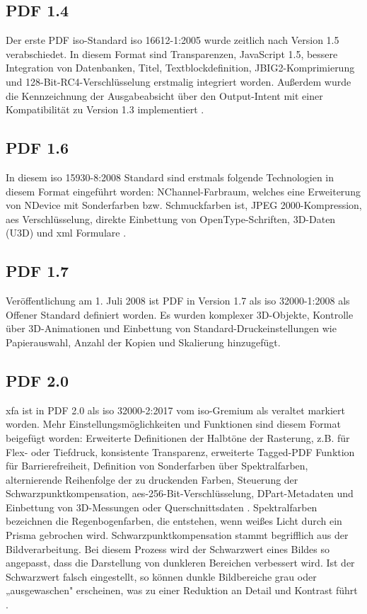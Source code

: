 \subsection{PDF 1.4}
Der erste PDF \gls{iso}-Standard \gls{iso} 16612-1:2005 wurde zeitlich nach Version 1.5 verabschiedet. In diesem Format sind Transparenzen, JavaScript 1.5, bessere Integration von Datenbanken, Titel, Textblockdefinition, JBIG2-Komprimierung und 128-Bit-RC4-Verschlüsselung erstmalig integriert worden\cite{proj-consult}. Außerdem wurde die Kennzeichnung der Ausgabeabsicht über den Output-Intent mit einer Kompatibilität zu Version 1.3 implementiert \cite{schneeberger}.

\subsection{PDF 1.6}
In diesem \gls{iso} 15930-8:2008 Standard sind erstmals folgende Technologien in diesem Format eingeführt worden: NChannel-Farbraum, welches eine Erweiterung von NDevice mit Sonderfarben bzw. Schmuckfarben ist, JPEG 2000-Kompression, \gls{aes} Verschlüsselung, direkte Einbettung von OpenType-Schriften, 3D-Daten (U3D) und \gls{xml} Formulare \cite{proj-consult}.

\subsection{PDF 1.7}
Veröffentlichung am 1. Juli 2008 ist PDF in Version 1.7 als \gls{iso} 32000-1:2008 als Offener Standard definiert worden. Es wurden komplexer 3D-Objekte, Kontrolle über 3D-Animationen und Einbettung von Standard-Druckeinstellungen wie Papierauswahl, Anzahl der Kopien und Skalierung hinzugefügt\cite{proj-consult}.


\subsection{PDF 2.0}
\gls{xfa} ist in PDF 2.0 als \gls{iso} 32000-2:2017 vom \gls{iso}-Gremium als veraltet markiert worden. Mehr Einstellungsmöglichkeiten und Funktionen sind diesem Format beigefügt worden: Erweiterte Definitionen der Halbtöne der Rasterung, z.B. für Flex- oder Tiefdruck, konsistente Transparenz, erweiterte Tagged-PDF Funktion für Barrierefreiheit, Definition von Sonderfarben über Spektralfarben, alternierende Reihenfolge der zu druckenden Farben, Steuerung der Schwarzpunktkompensation, \gls{aes}-256-Bit-Verschlüsselung, DPart-Metadaten und Einbettung von 3D-Messungen oder Querschnittsdaten \cite{proj-consult}.
Spektralfarben bezeichnen die Regenbogenfarben, die entstehen, wenn weißes Licht durch ein Prisma gebrochen wird. Schwarzpunktkompensation stammt begrifflich aus der Bildverarbeitung. Bei diesem Prozess wird der Schwarzwert eines Bildes so angepasst, dass die Darstellung von dunkleren Bereichen verbessert wird. Ist der Schwarzwert falsch eingestellt, so können dunkle Bildbereiche grau oder „ausgewaschen" erscheinen, was zu einer Reduktion an Detail und Kontrast führt \cite{schwarz}.